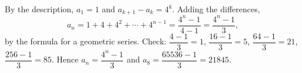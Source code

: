 By the description, $a_1=1$ and $a_{k+1}-a_k=4^k$. Adding the differences,
\[
a_n=1+4+4^2+\cdots+4^{n-1}=\dfrac{4^n-1}{4-1}=\dfrac{4^n-1}{3},
\]
by the formula for a geometric series. Check: $\dfrac{4-1}{3}=1$, $\dfrac{16-1}{3}=5$, $\dfrac{64-1}{3}=21$, $\dfrac{256-1}{3}=85$. Hence $a_n=\boxed{\dfrac{4^n-1}{3}}$ and $a_8=\dfrac{65536-1}{3}=\boxed{21845}$.
